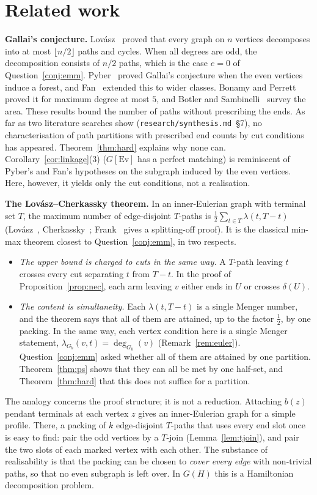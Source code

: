 \documentclass[11pt]{amsart}
\theoremstyle{definition}
\newcommand{\Ev}{\mathrm{Ev}}
\begin{document}
\section{Related work}\label{sec:related}

\textbf{Gallai's conjecture.} Lov\'asz~\cite{L68} proved that every graph on $n$ vertices decomposes
into at most $\lfloor n/2\rfloor$ paths and cycles. When all degrees are odd, the decomposition
consists of $n/2$ paths, which is the case $e=0$ of Question~\ref{conj:emm}. Pyber~\cite{Pyb96} proved Gallai's
conjecture when the even vertices induce a forest, and Fan~\cite{Fan05} extended this to wider
classes. Bonamy and Perrett~\cite{BP19} proved it for maximum degree at most $5$, and Botler and
Sambinelli~\cite{BS21} survey the area. These results bound the number of paths without prescribing
the ends. As far as two literature searches show (\texttt{research/synthesis.md}~\S7), no
characterisation of path partitions with prescribed end counts by cut conditions has appeared.
Theorem~\ref{thm:hard} explains why none can. Corollary~\ref{cor:linkage}(3) ($G[\Ev]$ has a perfect matching) is reminiscent
of Pyber's and Fan's hypotheses on the subgraph induced by the even vertices. Here, however, it
yields only the cut conditions, not a realisation.

\textbf{The Lov\'asz--Cherkassky theorem.} In an inner-Eulerian graph with terminal set $T$, the
maximum number of edge-disjoint $T$-paths is $\frac12\sum_{t\in T}\lambda(t,T-t)$
(Lov\'asz~\cite{L76}, Cherkassky~\cite{Ch77}; Frank~\cite{FrankBook} gives a splitting-off proof).
It is the classical min-max theorem closest to Question~\ref{conj:emm}, in two respects.
\begin{itemize}
\item \emph{The upper bound is charged to cuts in the same way.} A $T$-path leaving $t$ crosses every
cut separating $t$ from $T-t$. In the proof of Proposition~\ref{prop:nec}, each arm leaving $v$
either ends in $U$ or crosses $\delta(U)$.
\item \emph{The content is simultaneity.} Each $\lambda(t,T-t)$ is a single Menger number, and the
theorem says that all of them are attained, up to the factor $\frac12$, by one packing. In the same
way, each vertex condition here is a single Menger statement, $\lambda_{G_b}(v,t)=\deg_{G_b}(v)$
(Remark~\ref{rem:euler}). Question~\ref{conj:emm} asked whether all of them are attained by one
partition. Theorem~\ref{thm:ps} shows that they can all be met by one half-set, and
Theorem~\ref{thm:hard} that this does not suffice for a partition.
\end{itemize}
The analogy concerns the proof structure; it is not a reduction. Attaching $b(z)$ pendant terminals at
each vertex $z$ gives an inner-Eulerian graph for a simple profile. There, a packing of $k$
edge-disjoint $T$-paths that uses every end slot once is easy to find: pair the odd vertices by a
$T$-join (Lemma~\ref{lem:tjoin}), and pair the two slots of each marked vertex with each other. The
substance of realisability is that the packing can be chosen to \emph{cover every edge} with
non-trivial paths, so that no even subgraph is left over. In $G(H)$ this is a Hamiltonian
decomposition problem.
\end{document}
